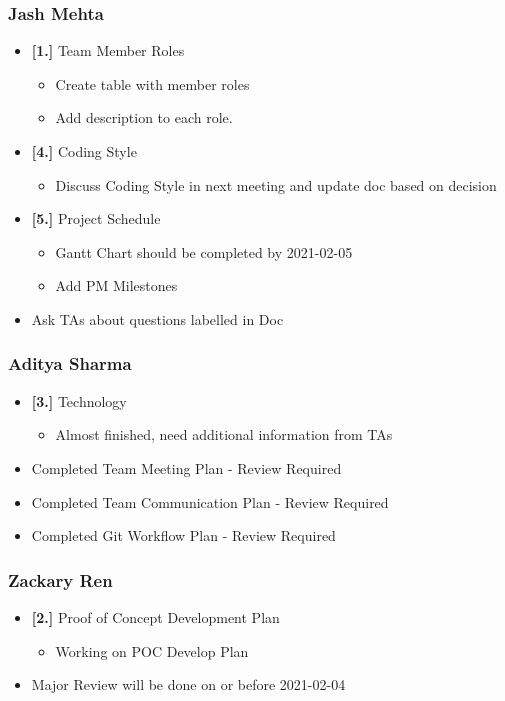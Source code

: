\documentclass[11pt, oneside]{article}   	%
\begin{document}
\subsubsection*{Jash Mehta}
\begin{itemize}
\item \textbf{[1.]} Team Member Roles
\begin{itemize}
\item Create table with member roles
\item Add description to each role.
\end{itemize}

\item \textbf{[4.]} Coding Style
\begin{itemize}
\item Discuss Coding Style in next meeting and update doc based on decision
\end{itemize}

\item \textbf{[5.]} Project Schedule
\begin{itemize}
\item Gantt Chart should be completed by 2021-02-05
\item Add PM Milestones
\end{itemize}

\item Ask TAs about questions labelled in Doc
\end{itemize}

\subsubsection*{Aditya Sharma}
\begin{itemize}
\item \textbf{[3.]} Technology
\begin{itemize}
\item Almost finished, need additional information from TAs
\end{itemize}

\item Completed Team Meeting Plan - Review Required
\item Completed Team Communication Plan - Review Required
\item Completed Git Workflow Plan - Review Required
\end{itemize}

\subsubsection*{Zackary Ren}
\begin{itemize}
\item \textbf{[2.]} Proof of Concept Development Plan
\begin{itemize}
\item Working on POC Develop Plan
\end{itemize}

\item Major Review will be done on or before 2021-02-04
\end{itemize}
\end{document}
